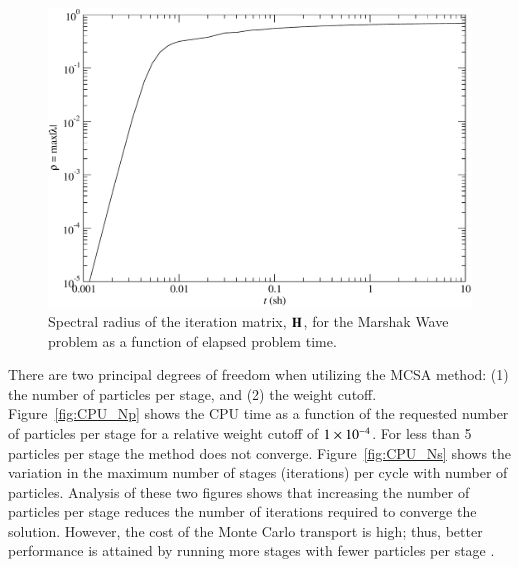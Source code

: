 \documentclass[preprint,12pt]{elsarticle}
\begin{document}
\begin{figure}[htpb!]
  \centerline{
    \includegraphics[width=5in,clip]{spectral_radius.pdf}}
  \caption{Spectral radius of the iteration matrix, $\mathbf{H}$, for the
    Marshak Wave problem as a function of elapsed problem time.}
  \label{fig:marshak_spectral}
\end{figure}

There are two principal degrees of freedom when utilizing the MCSA
method: (1) the number of particles per stage, and (2) the weight
cutoff.  Figure~\ref{fig:CPU_Np} shows the CPU time as a function of
the requested number of particles per stage for a relative weight
cutoff of $1\times 10^{-4}$.  For less than 5 particles per stage the
method does not converge.  Figure~\ref{fig:CPU_Ns} shows the variation
in the maximum number of stages (iterations) per cycle with number of
particles.  Analysis of these two figures shows that increasing the
number of particles per stage reduces the number of iterations
required to converge the solution.  However, the cost of the Monte
Carlo transport is high; thus, better performance is attained by
running more stages with fewer particles per stage \cite{evans_2003}.
\end{document}
